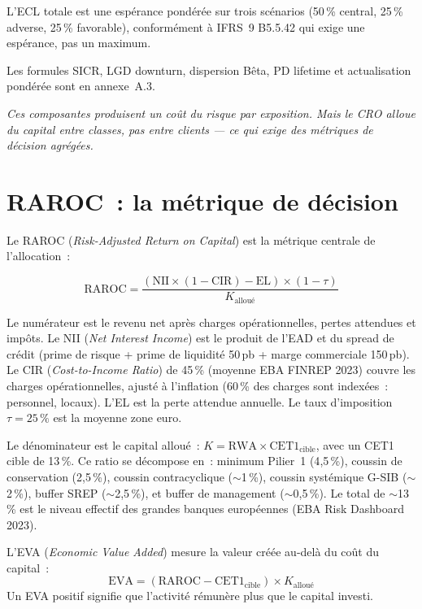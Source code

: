 \documentclass[10pt, a4paper, oneside]{report}
\theoremstyle{definition}
\begin{document}
L'ECL totale est une espérance pondérée sur trois scénarios (50\,\% central, 25\,\% adverse, 25\,\% favorable), conformément à IFRS~9 B5.5.42 qui exige une espérance, pas un maximum.

Les formules SICR, LGD downturn, dispersion Bêta, PD lifetime et actualisation pondérée sont en annexe~A.3.


\bigskip\noindent\textit{Ces composantes produisent un coût du risque par exposition. Mais le CRO alloue du capital entre classes, pas entre clients --- ce qui exige des métriques de décision agrégées.}




\section{RAROC~: la métrique de décision}
\label{sec:ch2:raroc}

Le RAROC (\emph{Risk-Adjusted Return on Capital}) est la métrique centrale de l'allocation~:

\begin{equation}
\text{RAROC} = \frac{(\text{NII} \times (1 - \text{CIR}) - \text{EL}) \times (1 - \tau)}{K_{\text{alloué}}}
\label{eq:raroc}
\end{equation}

Le numérateur est le revenu net après charges opérationnelles, pertes attendues et impôts. Le NII (\emph{Net Interest Income}) est le produit de l'EAD et du spread de crédit (prime de risque + prime de liquidité 50\,pb + marge commerciale 150\,pb). Le CIR (\emph{Cost-to-Income Ratio}) de 45\,\% (moyenne EBA FINREP 2023) couvre les charges opérationnelles, ajusté à l'inflation (60\,\% des charges sont indexées~: personnel, locaux). L'EL est la perte attendue annuelle. Le taux d'imposition $\tau = 25\,\%$ est la moyenne zone euro.

Le dénominateur est le capital alloué~: $K = \text{RWA} \times \text{CET1}_{\text{cible}}$, avec un CET1 cible de 13\,\%. Ce ratio se décompose en~: minimum Pilier~1 (4{,}5\,\%), coussin de conservation (2{,}5\,\%), coussin contracyclique ($\sim$1\,\%), coussin systémique G-SIB ($\sim$2\,\%), buffer SREP ($\sim$2{,}5\,\%), et buffer de management ($\sim$0{,}5\,\%). Le total de $\sim$13\,\% est le niveau effectif des grandes banques européennes (EBA Risk Dashboard 2023).

L'EVA (\emph{Economic Value Added}) mesure la valeur créée au-delà du coût du capital~:
\begin{equation}
\text{EVA} = (\text{RAROC} - \text{CET1}_{\text{cible}}) \times K_{\text{alloué}}
\label{eq:eva}
\end{equation}
Un EVA positif signifie que l'activité rémunère plus que le capital investi.
\end{document}
